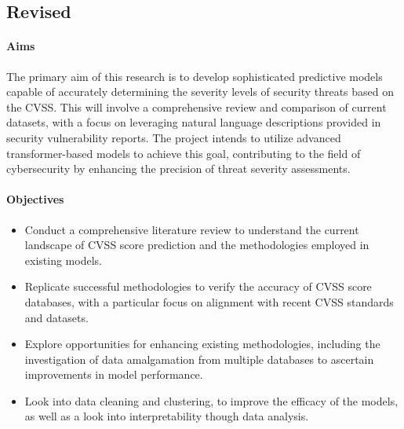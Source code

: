 \documentclass[12pt]{article}
\begin{document}
\subsection*{Revised}

\paragraph{Aims}

The primary aim of this research is to develop sophisticated predictive models capable of accurately determining
the severity levels of security threats based on the CVSS. This will involve a comprehensive review and comparison
of current datasets, with a focus on leveraging natural language descriptions provided in security vulnerability reports.
The project intends to utilize advanced transformer-based models to achieve this goal, contributing to the field of
cybersecurity by enhancing the precision of threat severity assessments.

\paragraph{Objectives}
\begin{itemize}[noitemsep]

	\item Conduct a comprehensive literature review to understand the current landscape of CVSS
	      score prediction and the methodologies employed in existing models.

	\item Replicate successful methodologies to verify the accuracy of CVSS score databases, with a
	      particular focus on alignment with recent CVSS standards and datasets.

	\item Explore opportunities for enhancing existing methodologies, including the investigation of
	      data amalgamation from multiple databases to ascertain improvements in model performance.

	\item Look into data cleaning and clustering, to improve the efficacy of the models, as well as
	      a look into interpretability though data analysis.

\end{itemize}
\end{document}
